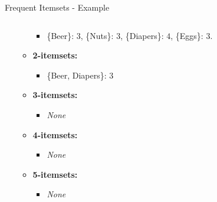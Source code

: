 \begin{frame}{Frequent Itemsets - Example}
\begin{columns}
\begin{column}{0.5\textwidth}
\begin{itemize}
\begin{itemize}
\begin{itemize}
						            \item \{Beer\}: $3$, \{Nuts\}: $3$, \{Diapers\}: $4$, \{Eggs\}: $3$.
					            \end{itemize}
					      \item \textbf{2-itemsets:}
					            \begin{itemize}
						            \item \{Beer, Diapers\}: $3$
					            \end{itemize}
					      \item \textbf{3-itemsets:}
					            \begin{itemize}
						            \item \textit{None}
					            \end{itemize}
					      \item \textbf{4-itemsets:}
					            \begin{itemize}
						            \item \textit{None}
					            \end{itemize}
					      \item \textbf{5-itemsets:}
					            \begin{itemize}
						            \item \textit{None}
					            \end{itemize}
				      \end{itemize}
			\end{itemize}
		\end{column}
	\end{columns}
\end{frame}


